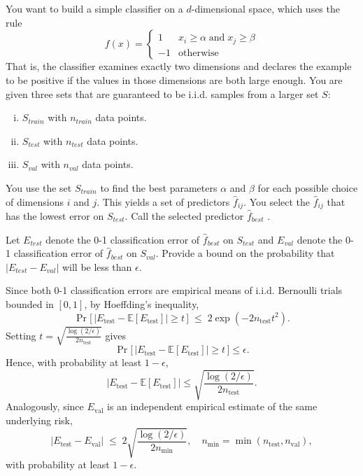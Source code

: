 \documentclass[a4paper]{article}
\begin{document}
\section{}
You want to build a simple classifier on a $d$-dimensional space, which uses the rule
$$f(x) = \left\{ \begin{array}{ll}
        1 & x_i \geq \alpha \; \text{and} \; x_j \geq \beta \\
        -1 & \text{otherwise}
\end{array}\right.$$
That is, the classifier examines exactly two dimensions and declares the example to be positive if the values in those dimensions are both large enough.
You are given three sets that are guaranteed to be i.i.d. samples from a larger set $S$:
\begin{enumerate}[(i)]
    \item $S_\mathit{train}$ with $n_\mathit{train}$ data points.
    \item $S_\mathit{test}$ with $n_\mathit{test}$ data points.
    \item $S_\mathit{val}$ with $n_\mathit{val}$ data points.
\end{enumerate}
You use the set $S_\mathit{train}$ to find the best parameters $\alpha$ and $\beta$ for each possible choice of dimensions $i$ and $j$.
This yields a set of predictors $\hat{f}_{ij}$.
You select the $\hat{f}_{ij}$ that has the lowest error on $S_\mathit{test}$.
Call the selected predictor $\hat{f}_{best}$ .

Let $E_\mathit{test}$ denote the 0-1 classification error of $\hat{f}_{best}$ on $S_\mathit{test}$ and $E_\mathit{val}$ denote the 0-1 classification error of $\hat{f}_{best}$ on $S_\mathit{val}$.
Provide a bound on the probability that $|E_\mathit{test} - E_\mathit{val}|$ will be less than $\epsilon$.


Since both 0-1 classification errors are empirical means of i.i.d. Bernoulli trials bounded in $[0,1]$, by Hoeffding’s inequality,
\[
\Pr\!\big[\,|E_{\mathrm{test}} - \mathbb{E}[E_{\mathrm{test}}]| \ge t\,\big]
\;\le\; 2\exp(-2n_{\mathrm{test}}t^2).
\]
Setting $t = \sqrt{\frac{\log(2/\epsilon)}{2n_{\mathrm{test}}}}$ gives
\[
\Pr\!\big[\,|E_{\mathrm{test}} - \mathbb{E}[E_{\mathrm{test}}]| \ge t\,\big] \le \epsilon.
\]
Hence, with probability at least $1-\epsilon$,
\[
\boxed{
|E_{\mathrm{test}} - \mathbb{E}[E_{\mathrm{test}}]| \le 
\sqrt{\frac{\log(2/\epsilon)}{2n_{\mathrm{test}}}}.
}
\]
Analogously, since $E_{\mathrm{val}}$ is an independent empirical estimate of the same underlying risk,
\[
\boxed{
|E_{\mathrm{test}} - E_{\mathrm{val}}|
\;\le\;
2\sqrt{\frac{\log(2/\epsilon)}{2n_{\min}}},
\quad n_{\min} = \min(n_{\mathrm{test}}, n_{\mathrm{val}}),
}
\]
with probability at least $1-\epsilon$.
\clearpage
\end{document}
